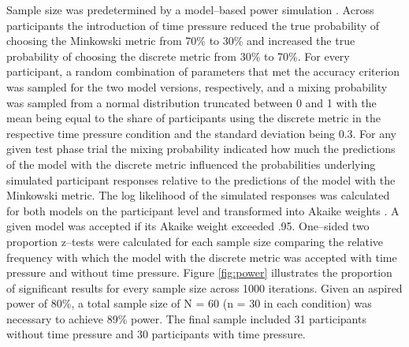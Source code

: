 \documentclass[a4paper,man,natbib]{apa6}
\begin{document}
Sample size was predetermined by a model--based power simulation \citep{gluth2019importance}. Across participants the introduction of time pressure reduced the true probability of choosing the Minkowski metric from 70\% to 30\% and increased the true probability of choosing the discrete metric from 30\% to 70\%. For every participant, a random combination of parameters that met the accuracy criterion was sampled for the two model versions, respectively, and a mixing probability was sampled from a normal distribution truncated between 0 and 1 with the mean being equal to the share of participants using the discrete metric in the respective time pressure condition and the standard deviation being  0.3. For any given test phase trial the mixing probability indicated how much the predictions of the model with the discrete metric influenced the probabilities underlying simulated participant responses relative to the predictions of the model with the Minkowski metric. The log likelihood of the simulated responses was calculated for both models on the participant level and transformed into Akaike weights \citep{wagenmakers2004aic}. A given model was accepted if its Akaike weight exceeded .95. One--sided two proportion z--tests were calculated for each sample size comparing the relative frequency with which the model with the discrete metric was accepted with time pressure and without time pressure. Figure \ref{fig:power} illustrates the proportion of significant results for every sample size across 1000 iterations. Given an aspired power of 80\%, a total sample size of N = 60 (n = 30 in each condition) was necessary to achieve 89\% power. The final sample included 31 participants without time pressure and 30 participants with time pressure.
\end{document}
